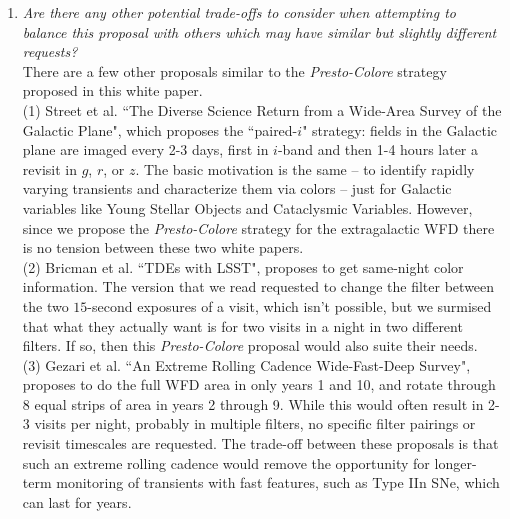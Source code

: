 \documentclass[12pt, letterpaper]{article}
\begin{document}
\begin{enumerate}
    \item {\footnotesize {\it Are there any other potential trade-offs to consider when attempting to balance this proposal with others which may have similar but slightly different requests?}} \\ There are a few other proposals similar to the {\em Presto-Colore} strategy proposed in this white paper. \\ (1) Street et al. ``The Diverse Science Return from a Wide-Area Survey of the Galactic Plane", which proposes the ``paired-$i$" strategy: fields in the Galactic plane are imaged every 2-3 days, first in $i$-band and then 1-4 hours later a revisit in $g$, $r$, or $z$. The basic motivation is the same -- to identify rapidly varying transients and characterize them via colors -- just for Galactic variables like Young Stellar Objects and Cataclysmic Variables. However, since we propose the {\em Presto-Colore} strategy for the extragalactic WFD there is no tension between these two white papers. \\ (2) Bricman et al. ``TDEs with LSST", proposes to get same-night color information. The version that we read requested to change the filter between the two $15$-second exposures of a visit, which isn't possible, but we surmised that what they actually want is for two visits in a night in two different filters. If so, then this {\em Presto-Colore} proposal would also suite their needs. \\ (3) Gezari et al. ``An Extreme Rolling Cadence Wide-Fast-Deep Survey", proposes to do the full WFD area in only years 1 and 10, and rotate through 8 equal strips of area in years 2 through 9. While this would often result in 2-3 visits per night, probably in multiple filters, no specific filter pairings or revisit timescales are requested. The trade-off between these proposals is that such an extreme rolling cadence would remove the opportunity for longer-term monitoring of transients with fast features, such as Type IIn SNe, which can last for years. 
\end{enumerate}


\clearpage
\end{document}
